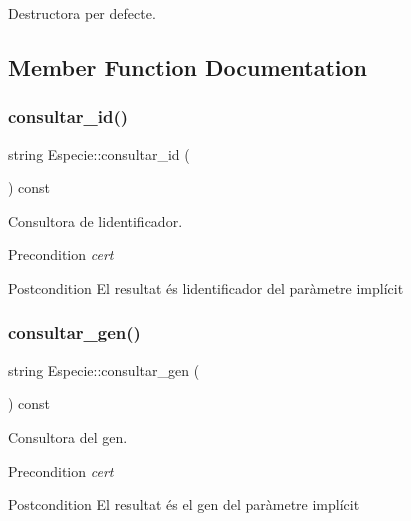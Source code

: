 Destructora per defecte. 



\subsection{Member Function Documentation}
\mbox{\label{class_especie_a1652f05cd2ff7dc71123bf538ecc4476}} 
\subsubsection{\texorpdfstring{consultar\+\_\+id()}{consultar\_id()}}
{\footnotesize\ttfamily string Especie\+::consultar\+\_\+id (\begin{DoxyParamCaption}{ }\end{DoxyParamCaption}) const}



Consultora de l\textquotesingle{}identificador. 

\begin{DoxyPrecond}{Precondition}
{\itshape cert} 
\end{DoxyPrecond}
\begin{DoxyPostcond}{Postcondition}
El resultat és l\textquotesingle{}identificador del paràmetre implícit 
\end{DoxyPostcond}
\mbox{\label{class_especie_a850af2b59a21e2d801c59d76ba5c1a98}} 
\subsubsection{\texorpdfstring{consultar\+\_\+gen()}{consultar\_gen()}}
{\footnotesize\ttfamily string Especie\+::consultar\+\_\+gen (\begin{DoxyParamCaption}{ }\end{DoxyParamCaption}) const}



Consultora del gen. 

\begin{DoxyPrecond}{Precondition}
{\itshape cert} 
\end{DoxyPrecond}
\begin{DoxyPostcond}{Postcondition}
El resultat és el gen del paràmetre implícit 
\end{DoxyPostcond}
\mbox{\label{class_especie_a942d65fe47049ce8fb9330e29455f5f5}} 
